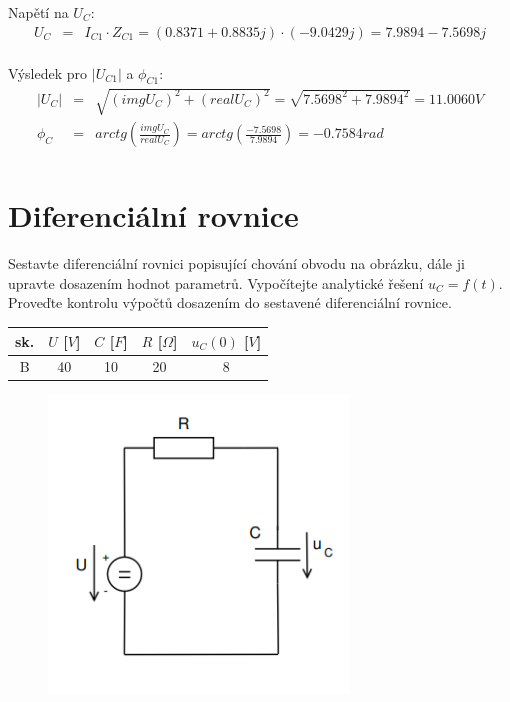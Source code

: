 \documentclass[a4paper,oneside,13pt]{article}
\begin{document}
	Napětí na $U_{C}$:
	\begin{eqnarray*}
	 	U_{C}  & = & I_{C1} \cdot Z_{C1} = (0.8371 + 0.8835j) \cdot (-9.0429j) = 7.9894 - 7.5698j \\
	\end{eqnarray*}

	Výsledek pro $|U_{C1}|$ a $\phi_{C1}$:
	\begin{eqnarray*}
		|U_{C}| & = & \sqrt{(imgU_{C})^2 + (realU_{C})^2} = \sqrt{7.5698^2 + 7.9894^2} = 11.0060V \\
		\phi_{C} & = & arctg(\frac{imgU_{C}}{realU_{C}}) = arctg(\frac{-7.5698}{7.9894}) = -0.7584 rad \\
	\end{eqnarray*}


	\newpage
	\section{Diferenciální rovnice}

	Sestavte diferenciální rovnici popisující chování obvodu na obrázku, dále ji upravte dosazením hodnot parametrů. Vypočítejte analytické řešení $u_{C} = f(t)$. \\
	Proveďte kontrolu výpočtů dosazením do sestavené diferenciální rovnice.
	\begin{table}[h]
		\begin{center}
			\begin{tabular}{|c|c|c|c|c|}
				\hline
				sk. & $U$ [$V$] & $C$ [$F$] & $R$ [$\Omega$] & $u_{C}(0)$ [$V$] \\
				\hline
				B &  40 & 10 & 20 & 8 \\
				\hline
			\end{tabular}
		\end{center}
	\end{table}
	\begin{figure}[h]
		\begin{center}
			\includegraphics[width=8cm,keepaspectratio]{Diferencialni_5.PNG}
		\end{center}
	\end{figure}
\end{document}
